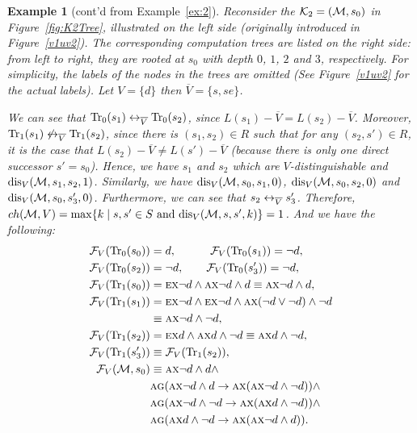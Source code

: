 \documentclass{article}
\newtheorem{example}{Example}
\begin{document}
\begin{example}[cont'd from Example~\ref{ex:2}]
Reconsider the ${\cal K}_2= ({\cal M}, s_0)$  in Figure~\ref{fig:K2Tree}, illustrated on the left side   (originally introduced in Figure~\ref{v1uv2}).   The corresponding computation trees are listed on the right side: from left to right, they are rooted at $s_0$ with depth $0$, $1$, $2$ and $3$, respectively. For simplicity, the labels of the nodes in the trees are omitted (See Figure~\ref{v1uv2} for the actual labels). Let $V=\{d\}$ then $\overline{V}=\{s, se\}$.

 We can see that $\textrm{Tr}_0(s_1) \leftrightarrow_{\overline{V}} \textrm{Tr}_0(s_2)$, since $L(s_1) - \overline{V} = L(s_2) - \overline{V}$. Moreover, $\textrm{Tr}_1(s_1) \not \leftrightarrow_{\overline{V}} \textrm{Tr}_1(s_2)$, since there is $(s_1, s_2)\in R$ such that for any $(s_2, s') \in R$, it is the case that $L(s_2)- \overline V \neq L(s') - \overline V$ (because there is only one direct successor $s'=s_0$). Hence, we have $s_1$ and $s_2$ which are $V$-distinguishable and  $\textrm{dis}_{V}({\cal M}, s_1, s_2, 1)$. Similarly, we have  $\textrm{dis}_{ V}({\cal M}, s_0, s_1, 0)$, $\textrm{dis}_{V}({\cal M}, s_0, s_2, 0)$ and $\textrm{dis}_{ V}({\cal M}, s_0, s_3', 0)$. Furthermore, we can see that $s_2 \leftrightarrow_{\overline V} s_3'$. Therefore, $ch({\cal M}, V)=\max\{k\mid s,s'\in S \text{ and } \textrm{dis}_{V}({\cal M},s,s',k)\} = 1$.
 And  we have the following:
 \begin{align*}
   {\cal F}_V(\textrm{Tr}_0(s_0)) &= d, \qquad \quad {\cal F}_V(\textrm{Tr}_0(s_1)) = \neg d, \\
   {\cal F}_V(\textrm{Tr}_0(s_2)) &= \neg d,  \qquad  {\cal F}_V(\textrm{Tr}_0(s_3')) = \neg d,\\
   {\cal F}_V(\textrm{Tr}_1(s_0)) &= \textsc{e}\textsc{x} \neg d \wedge \textsc{a}\textsc{x} \neg d \wedge d \equiv \textsc{a}\textsc{x} \neg d \wedge d, \\
   {\cal F}_V(\textrm{Tr}_1(s_1)) &= \textsc{e}\textsc{x} \neg d \wedge \textsc{e}\textsc{x} \neg d  \wedge \textsc{a}\textsc{x} (\neg d \vee \neg d) \wedge \neg d \\
   &\equiv \textsc{a}\textsc{x} \neg d \wedge \neg d, \\
   {\cal F}_V(\textrm{Tr}_1(s_2)) &= \textsc{e}\textsc{x} d  \wedge \textsc{a}\textsc{x} d \wedge \neg d \equiv \textsc{a}\textsc{x} d \wedge \neg d,\\
   {\cal F}_V(\textrm{Tr}_1(s_3')) &\equiv {\cal F}_V(\textrm{Tr}_1(s_2)),\\
  {\cal F}_V({\cal M}, s_0)&\equiv \textsc{a}\textsc{x} \neg d \wedge d \wedge \\
  & \textsc{a} \textsc{g}(\textsc{a}\textsc{x} \neg d \wedge d \rightarrow \textsc{a}\textsc{x}(\textsc{a}\textsc{x} \neg d \wedge \neg d))\wedge \\
  & \textsc{a} \textsc{g}(\textsc{a}\textsc{x} \neg d \wedge \neg d \rightarrow \textsc{a}\textsc{x}(\textsc{a}\textsc{x} d \wedge \neg d)) \wedge\\
  & \textsc{a} \textsc{g}(\textsc{a}\textsc{x} d \wedge \neg d \rightarrow \textsc{a}\textsc{x}(\textsc{a}\textsc{x} \neg d \wedge d)).
\end{align*}




\end{example}
\end{document}

